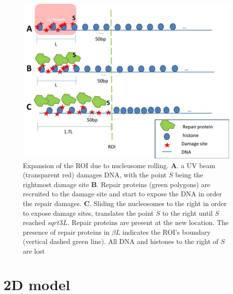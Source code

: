 \documentclass[12pt]{paper}
\begin{document}
	\begin{figure}
	\centering
	\includegraphics[width=0.7\linewidth]{histoneSlidingMulti}
	\caption{Expansion of the ROI due to nucleusome rolling. \textbf{A}. a UV beam (transparent red) damages DNA, with the point $S$ being the rightmost damage site \textbf{B}. Repair proteins (green polygons) are recruited to the damage site and start to expose the DNA in order the repair damages. \textbf{C}. Sliding the nucleosomes to the right in order to expose damage sites, translates the point $S$ to the right until $S$ reached $sqrt{3}L$. Repair proteins are present at the new location. The presence of repair proteins in $\beta L$ indicates the ROI's boundary (vertical dashed green line). All DNA and histones to the right of $S$ are lost}
	\label{fig:histoneSlidingMulti}
	\end{figure}
	
	\section{2D model}
	
	
\end{document}
